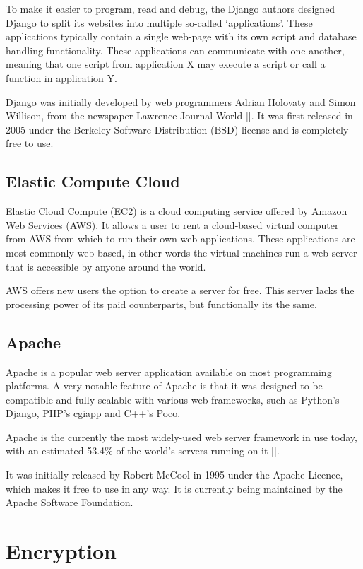To make it easier to program, read and debug, the Django authors designed Django to split
its websites into multiple so-called `applications'. These applications typically contain
a single web-page with its own script and database handling functionality. These
applications can communicate with one another, meaning that one script from application X
may execute a script or call a function in application Y.  

Django was initially developed by web programmers Adrian Holovaty and Simon Willison, from the
newspaper Lawrence Journal World [\cite{website:django-exist}]. It was first released in 2005
under the Berkeley Software Distribution (BSD) license and is completely free to use.

\subsection{Elastic Compute Cloud}
\label{sec:ec2}

Elastic Cloud Compute (EC2) is a cloud computing service offered by Amazon Web Services (AWS).
It allows a user to rent a cloud-based virtual computer from AWS from which to run their
own web applications.
These applications are most commonly web-based, in other words the virtual machines run a
web server that is accessible by anyone around the world.  

AWS offers new users the option to create a server for free. This server lacks the
processing power of its paid counterparts, but functionally its the same. 

\subsection{Apache}
\label{sec:apache}

Apache is a popular web server application available on most programming platforms. A
very notable feature of Apache is that it was designed to be compatible and fully scalable
with various web frameworks, such as Python's Django, PHP's cgiapp and C++'s Poco.

Apache is the currently the most widely-used web server framework in use today, with an
estimated 53.4\% of the world's servers running on it [\cite{website:apache-usage}].

It was initially released by Robert McCool in 1995 under the Apache Licence, which makes it
free to use in any way. It is currently being maintained by the Apache Software Foundation. 

\section{Encryption}

